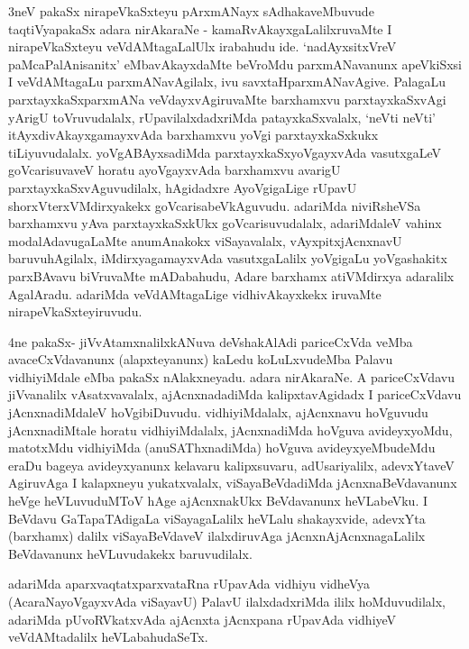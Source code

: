 \begin{artha}
3neV pakaSx nirapeVkaSxteyu pArxmANayx sAdhakaveMbuvude taqtiVyapakaSx
adara \-nirAkaraNe - kamaRvAkayxgaLalilxruvaMte I nirapeVkaSxteyu
veVdAMtagaLalUlx ira\-bahudu ide. `nadAyxsitxVreV paMcaPalAnisanitx' eMbavAkayxdaMte beVroMdu
parxmANa\-vanunx apeVkiSxsi I veVdAMtagaLu parxmANavAgilalx, ivu
savxtaHparxmANavAgive. \-PalagaLu parxtayxkaSxparxmANa veVdayxvAgiruvaMte
barxhamxvu parxtayxkaSxvAgi yArigU toVru\-vudalalx, rUpavilalxdadxriMda
patayxkaSxvalalx, `neVti neVti' itAyxdivAkayxgamayxvAda barxhamxvu
yoVgi parxtayxkaSxkukx tiLiyuvudalalx. yoVgABAyxsadiMda
parxtayxkaSxyoVgayxvAda \-vasutxgaLeV goVcarisuvaveV horatu
ayoVgayxvAda barxhamxvu avarigU parxtayxkaSxvAguvudilalx, hAgidadxre
AyoVgigaLige rUpavU shorxVterxVMdirxyakekx
goVcarisabeVkAguvudu. \-adariMda niviRsheVSa barxhamxvu yAva
parxtayxkaSxkUkx goVcarisuvudalalx, adariMdaleV vahinx
modalAdavugaLaMte anumAnakokx viSayavalalx, vAyxpitxjAcnxnavU
\break baruvuhAgilalx, iMdirxyagamayxvAda vasutxgaLalilx yoVgigaLu
yoVgashakitx parxBAvavu biVruvaMte mADabahudu, Adare barxhamx
atiVMdirxya adaralilx AgalAradu. \break adariMda veVdAMtagaLige
vidhivAkayxkekx iruvaMte nirapeVkaSxteyiruvudu.
\end{artha}

\begin{artha}
4ne pakaSx- jiVvAtamxnalilxkANuva deVshakAlAdi pariceCxVda veMba
avaceCxVdavanunx (alapxteyanunx) kaLedu koLuLxvudeMba Palavu
vidhiyiMdale eMba pakaSx nAlakxneyadu. adara
nirAkaraNe. A pariceCxVdavu jiVvanalilx vAsatxvavalalx, ajAcnxnadadiMda
kalipxta\-vAgidadx I pariceCxVdavu jAcnxnadiMdaleV
hoVgibiDuvudu. vidhiyiMdalalx, ajAcnxnavu\-	hoVguvudu jAcnxnadiMtale
horatu vidhiyiMdalalx, jAcnxnadiMda hoVguva avideyxyoMdu, matotxMdu
vidhiyiMda (anuSAThxnadiMda) hoVguva avideyxyeMbudeMdu eraDu bageya
avideyxyanunx kelavaru kalipxsuvaru, adUsariyalilx, adevxYtaveV
AgiruvAga I kalapxneyu yukatxvalalx, viSayaBeVdadiMda
jAcnxnaBeVdavanunx heVge heVLuvuduMToV hAge ajAcnxnakUkx BeVdavanunx
heVLabeVku. I BeVdavu GaTa\-paTAdigaLa viSayagaLalilx heVLalu
shakayxvide, adevxYta (barxhamx) dalilx viSayaBeVdaveV ilalxdiruvAga
jAcnxnA\s jAcnxnagaLalilx BeVdavanunx heVLuvudakekx baruvudilalx.

adariMda aparxvaqtatxparxvataRna rUpavAda vidhiyu vidheVya
(AcaraNayoVgayx\-vAda viSayavU) PalavU ilalxdadxriMda ililx
hoMduvudilalx, adariMda pUvoRVkatx\-vAda ajAcnxta jAcnxpana rUpavAda
vidhiyeV veVdAMtadalilx heVLabahudaSeTx.
\end{artha}

